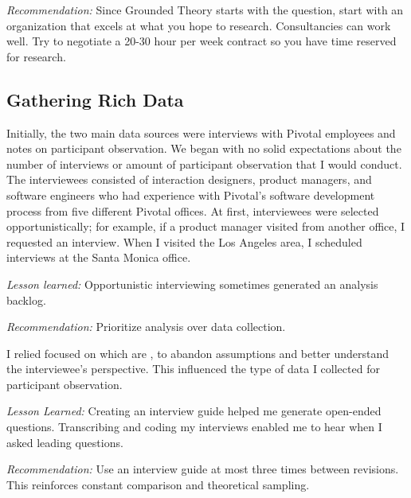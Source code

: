\textit{Recommendation:} Since Grounded Theory starts with the question,  start with an organization that excels at what you hope to research. Consultancies can work well. Try to negotiate a 20-30 hour per week contract so you have time reserved for research.
\subsection{Gathering Rich Data}
Initially, the two main data sources were interviews with Pivotal employees and notes on participant observation. We began with no solid expectations about the number of interviews or amount of participant observation that I would conduct. The interviewees consisted of interaction designers, product managers, and software engineers who had experience with Pivotal's software development process from five different Pivotal offices. At first, interviewees were selected opportunistically; for example, if a product manager visited from another office, I requested an interview. When I visited the Los Angeles area, I scheduled interviews at the Santa Monica office. 

\textit{Lesson learned:} Opportunistic interviewing sometimes generated an analysis backlog. 

\textit{Recommendation:} Prioritize analysis over data collection. 

I relied focused on  which are  \cite{Charmaz}, to abandon assumptions and better understand the interviewee's perspective. This influenced the type of data I collected for participant observation. 

\textit{Lesson Learned:} Creating an interview guide helped me generate open-ended questions. Transcribing and coding my interviews enabled me to hear when I asked leading questions.

\textit{Recommendation:} Use an interview guide at most three times between revisions. This reinforces constant comparison and theoretical sampling. 


